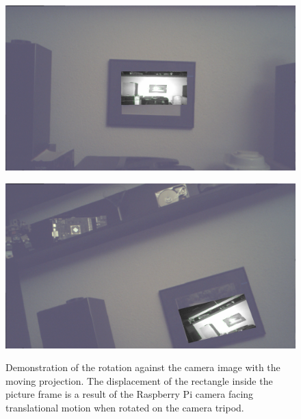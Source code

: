 \begin{figure}[H]
  \centering
  \begin{minipage}[b]{0.47\textwidth}
    \includegraphics[scale=0.1115]{images/demo_rotation_init.png}
    \label{fig:rotation_demo_init} 
  \end{minipage} %
  \begin{minipage}[b]{0.47\textwidth}
    \includegraphics[scale=0.1115]{images/demo_rotation_rotated.png} 
    \label{fig:rotation_demo_rotated} 
  \end{minipage}
  \caption{Demonstration of the rotation against the camera image with the moving projection. The displacement of the rectangle inside the picture frame is a result of the Raspberry Pi camera facing translational motion when rotated on the camera tripod.}
  \label{fig:rotation_demo}
\end{figure}
